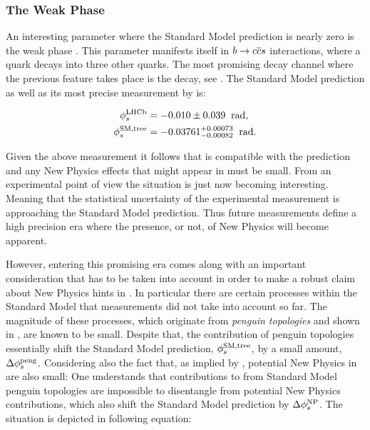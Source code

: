 \subsubsection{The Weak Phase \phis}

An interesting parameter where the Standard Model prediction is nearly zero is the weak phase \phis.
This parameter manifests itself in $b\rightarrow c\overline {c}s$ interactions, where a \bquark
quark decays into three other quarks. The most promising decay channel where the previous feature
takes place is the \BsJpsiPhi decay, see . The Standard Model \phis
prediction as well as its most precise measurement by \lhcb is:

\begin{subequations}
  \label{app_phis_lhcb_theo}
  \begin{align}
  \centering
  \phiS{\lhcb}           &=  -0.010 \pm 0.039  \;\; \text{rad},
  \label{app_phis_lhcb}\\
  \phiS{SM,tree}  &= -0.03761 {}^{+0.00073}_{-0.00082}  \;\; \text{rad}.
  \label{app_phis_theo}
\end{align}
\end{subequations}

\noindent Given the above measurement it follows that \phis is compatible
with the prediction and any New Physics effects that might appear in \phis must be small.
From an experimental point of view the situation is just now becoming interesting.
Meaning that the statistical uncertainty of the experimental measurement is approaching
the Standard Model prediction. Thus future \phis measurements define a high precision
era where the presence, or not, of New Physics will become apparent.

However, entering this promising era comes along with an important consideration
that has to be taken into account in order to make a robust claim about New Physics hints in \phis.
In particular there are certain processes within the Standard Model that \phis measurements
did not take into account so far. The magnitude of these processes, which originate from {\it penguin topologies}
and shown in , are known to be small. Despite that, the
contribution of penguin topologies essentially shift the Standard Model prediction,
$\phi_{s}^{\tiny \text{SM,tree}}$, by a small amount, $\Delta\phi_{s}^{\tiny\text{peng}}$. Considering
also the fact that, as implied by , potential New Physics
in \phis are also small: One understands that contributions to \phis from Standard Model penguin
topologies are impossible to disentangle from potential New Physics contributions, which also
shift the Standard Model prediction by $\Delta\phi_{s}^{\tiny \text{NP}}$.
The situation is depicted in following equation:

